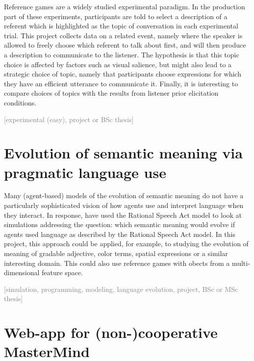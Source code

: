 \documentclass[fleqn,reqno,10pt]{article}
\newcommand{\scope}[1]{\hfill\textcolor{gray}{[#1]}}
\begin{document}
Reference games are a widely studied experimental paradigm. In the production part of these experiments, participants are told to select a description of a referent which is highlighted as the topic of conversation in each experimental trial. This project collects data on a related event, namely where the speaker is allowed to freely choose which referent to talk about first, and will then produce a description to communicate to the listener. The hypothesis is that this topic choice is affected by factors such as visual salience, but might also lead to a strategic choice of topic, namely that participants choose expressions for which they have an efficient utterance to communicate it. Finally, it is interesting to compare choices of topics with the results from listener prior elicitation conditions.

\scope{experimental (easy), project or BSc thesis}

\section{Evolution of semantic meaning via pragmatic language use}

Many (agent-based) models of the evolution of semantic meaning do not have a particularly sophisticated vision of how agents use and interpret language when they interact. In response, \citet{BrochhagenFranke2016:Learning-biases,BrochhagenFranke2017:Effects-of-tran} have used the Rational Speech Act model to look at simulations addressing the question: which semantic meaning would evolve if agents used language as described by the Rational Speech Act model. In this project, this approach could be applied, for example, to studying the evolution of meaning of gradable adjective, color terms, spatial expressions or a similar interesting domain. This could also use reference games with obects from a multi-dimensional feature space.

\scope{simulation, programming, modeling, language evolution, project, BSc or MSc thesis}

\section{Web-app for (non-)cooperative MasterMind}
\end{document}
